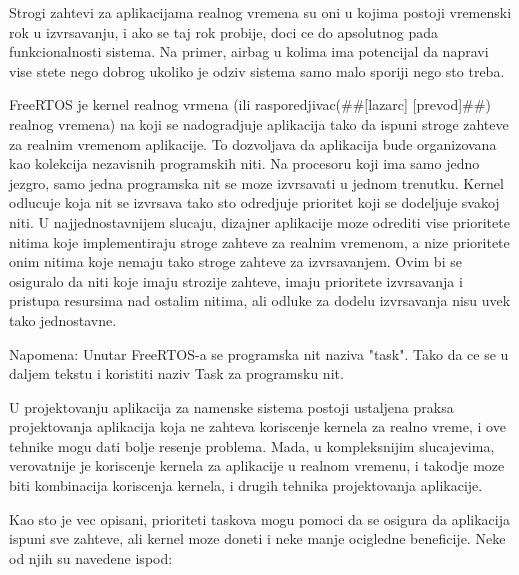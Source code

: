 \documentclass[a4paper,12pt, master]{etf}
\begin{document}
	Strogi zahtevi za aplikacijama realnog vremena su oni u kojima postoji vremenski rok u
	izvrsavanju, i ako se taj rok probije, doci ce do apsolutnog pada funkcionalnosti sistema. 
	Na primer, airbag u kolima ima potencijal da napravi vise stete nego dobrog ukoliko je 
	odziv sistema samo malo sporiji nego sto treba.

	FreeRTOS je kernel realnog vrmena (ili rasporedjivac(\#\#[lazarc] [prevod]\#\#) realnog 
	vremena) na	koji se nadogradjuje aplikacija tako da ispuni stroge zahteve za realnim 
	vremenom aplikacije. To dozvoljava da aplikacija bude organizovana kao kolekcija 
	nezavisnih programskih niti. Na	procesoru koji ima samo jedno jezgro, samo jedna 
	programska nit se moze izvrsavati u jednom trenutku. Kernel odlucuje koja nit se izvrsava 
	tako sto odredjuje prioritet koji se dodeljuje svakoj niti. U najjednostavnijem slucaju, 
	dizajner aplikacije moze odrediti vise prioritete nitima koje implementiraju stroge 
	zahteve za realnim vremenom, a nize prioritete onim nitima koje nemaju tako stroge zahteve 
	za izvrsavanjem. Ovim bi se osiguralo da niti koje imaju strozije zahteve, imaju 
	prioritete izvrsavanja i pristupa resursima nad ostalim nitima, ali odluke za dodelu 
	izvrsavanja nisu uvek tako jednostavne.

	Napomena: Unutar FreeRTOS-a se programska nit naziva "task". Tako da ce se u daljem tekstu 
	i koristiti naziv Task za programsku nit.

	U projektovanju aplikacija za namenske sistema postoji ustaljena praksa projektovanja
	aplikacija koja ne zahteva koriscenje kernela za realno vreme, i ove tehnike mogu dati 
	bolje resenje problema. Mada, u kompleksnijim slucajevima, verovatnije je koriscenje 
	kernela za aplikacije u realnom vremenu, i takodje moze biti kombinacija koriscenja 
	kernela, i drugih tehnika projektovanja aplikacije.

	Kao sto je vec opisani, prioriteti taskova mogu pomoci da se osigura da aplikacija ispuni 
	sve	zahteve, ali kernel moze doneti i neke manje ocigledne beneficije. Neke od njih su 
	navedene ispod:
	
\end{document}
